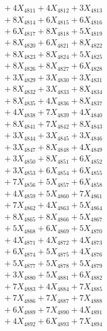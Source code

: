 \documentclass[a4paper,10pt]{article}
\begin{document}
{\begin{align}
&\;  + 4 X_{4811} + 4 X_{4812} + 3 X_{4813} \\[0.3ex]
&\;  + 8 X_{4814} + 6 X_{4815} + 6 X_{4816} \\[0.3ex]
&\;  + 6 X_{4817} + 8 X_{4818} + 5 X_{4819} \\[0.3ex]
&\;  + 8 X_{4820} + 6 X_{4821} + 8 X_{4822} \\[0.3ex]
&\;  + 8 X_{4823} + 8 X_{4824} + 5 X_{4825} \\[0.3ex]
&\;  + 8 X_{4826} + 8 X_{4827} + 6 X_{4828} \\[0.3ex]
&\;  + 3 X_{4829} + 3 X_{4830} + 3 X_{4831} \\[0.3ex]
&\;  + 8 X_{4832} + 3 X_{4833} + 8 X_{4834} \\[0.3ex]
&\;  + 8 X_{4835} + 4 X_{4836} + 8 X_{4837} \\[0.3ex]
&\;  + 4 X_{4838} + 7 X_{4839} + 4 X_{4840} \\[0.5ex]\allowbreak
&\;  + 8 X_{4841} + 7 X_{4842} + 8 X_{4843} \\[0.3ex]
&\;  + 3 X_{4844} + 3 X_{4845} + 3 X_{4846} \\[0.3ex]
&\;  + 3 X_{4847} + 8 X_{4848} + 4 X_{4849} \\[0.3ex]
&\;  + 3 X_{4850} + 8 X_{4851} + 6 X_{4852} \\[0.3ex]
&\;  + 3 X_{4853} + 6 X_{4854} + 6 X_{4855} \\[0.3ex]
&\;  + 7 X_{4856} + 5 X_{4857} + 6 X_{4858} \\[0.3ex]
&\;  + 4 X_{4859} + 5 X_{4860} + 7 X_{4861} \\[0.3ex]
&\;  + 7 X_{4862} + 4 X_{4863} + 5 X_{4864} \\[0.3ex]
&\;  + 8 X_{4865} + 8 X_{4866} + 5 X_{4867} \\[0.3ex]
&\;  + 5 X_{4868} + 6 X_{4869} + 5 X_{4870} \\[0.5ex]\allowbreak
&\;  + 4 X_{4871} + 4 X_{4872} + 4 X_{4873} \\[0.3ex]
&\;  + 6 X_{4874} + 5 X_{4875} + 4 X_{4876} \\[0.3ex]
&\;  + 5 X_{4877} + 5 X_{4878} + 5 X_{4879} \\[0.3ex]
&\;  + 3 X_{4880} + 5 X_{4881} + 6 X_{4882} \\[0.3ex]
&\;  + 7 X_{4883} + 4 X_{4884} + 7 X_{4885} \\[0.3ex]
&\;  + 7 X_{4886} + 7 X_{4887} + 7 X_{4888} \\[0.3ex]
&\;  + 6 X_{4889} + 7 X_{4890} + 4 X_{4891} \\[0.3ex]
&\;  + 4 X_{4892} + 6 X_{4893} + 7 X_{4894} \\[0.3ex]

\end{align}}
\end{document}
